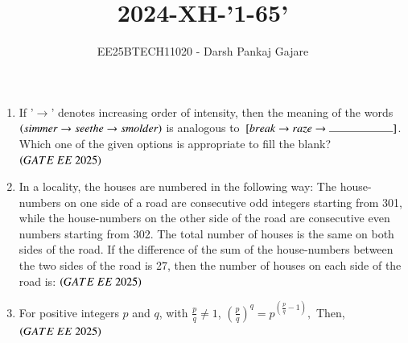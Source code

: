 \documentclass[journal,12pt,onecolumn]{IEEEtran}
\theoremstyle{remark}
\begin{document}
\title{2024-XH-'1-65'}
\author{EE25BTECH11020 - Darsh Pankaj Gajare}
\maketitle
\begin{enumerate}

\item If '$\rightarrow $' denotes increasing order of intensity, then the meaning of the words $\brak{simmer \rightarrow  seethe \rightarrow  smolder}$ is analogous to $\sbrak{break \rightarrow  raze \rightarrow  \rule{2cm}{0.4pt} }$. Which one of the given options is appropriate to fill the blank? 
\hfill $\brak{GATE\ EE\ 2025}$
    \begin{enumerate}
  \end{enumerate}
   \item In a locality, the houses are numbered in the following way:
The house-numbers on one side of a road are consecutive odd integers starting from 301, while the house-numbers on the other side of the road are consecutive even numbers starting from 302. The total number of houses is the same on both sides of the road.
If the difference of the sum of the house-numbers between the two sides of the road is 27, then the number of houses on each side of the road is: 
   \hfill $\brak{GATE\ EE\ 2025}$
       \begin{enumerate}
  \end{enumerate}
   \item For positive integers $ p $ and $ q $, with $ \frac{p}{q} \neq 1 $, 
$\left( \frac{p}{q} \right)^q = p^{\left( \frac{p}{q} - 1 \right)},$
Then,
\hfill $\brak{GATE\ EE\ 2025}$
    \begin{enumerate}
\end{enumerate}
\end{enumerate}
\end{document}
